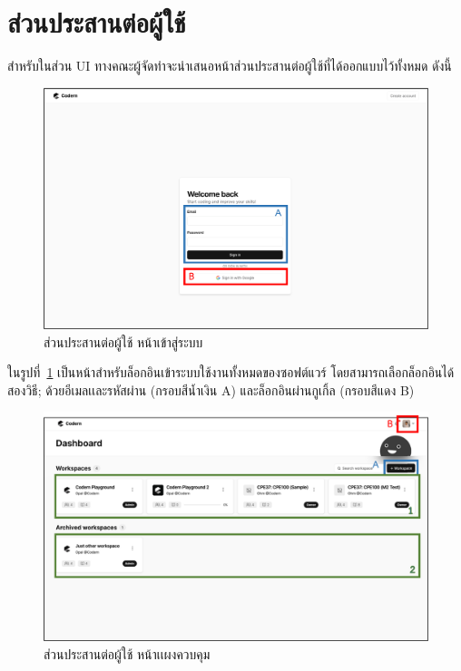 \documentclass[12pt,oneside,openright,a4paper]{cpe-thai-project}
\begin{document}
\pagebreak
\section{ส่วนประสานต่อผู้ใช้}
    \begin{flushleft}
    สำหรับในส่วน UI ทางคณะผู้จัดทำจะนำเสนอหน้าส่วนประสานต่อผู้ใช้ที่ได้ออกแบบไว้ทั้งหมด ดังนี้
    \end{flushleft}
    
    \hypertarget{ui-login}{
        \begin{figure}[H]
        \centering
            \includegraphics[width=15cm]{figure/ui/ui-login1.png}
        \caption[ส่วนประสานต่อผู้ใช้ หน้าเข้าสู่ระบบ]{ส่วนประสานต่อผู้ใช้ หน้าเข้าสู่ระบบ}\label{fig:ui-login}
        \end{figure}
    }
    
    \begin{flushleft}
    ในรูปที่~\ref{fig:ui-login} เป็นหน้าสำหรับล็อกอินเข้าระบบใช้งานทั้งหมดของซอฟต์แวร์ โดยสามารถเลือกล็อกอินได้สองวิธี; ด้วยอีเมลเเละรหัสผ่าน (กรอบสีน้ำเงิน A) และล็อกอินผ่านกูเกิ้ล (กรอบสีแดง B) 
    \end{flushleft}

    \hypertarget{ui-dashboard1}{
        \begin{figure}[H]
        \centering
            \includegraphics[width=15cm]{figure/ui/ui-dashboard1.png}
        \caption[ส่วนประสานต่อผู้ใช้ หน้าเเผงควบคุม (1)]{ส่วนประสานต่อผู้ใช้ หน้าเเผงควบคุม}\label{fig:ui-dashboard1}
        \end{figure}
    }
\end{document}
